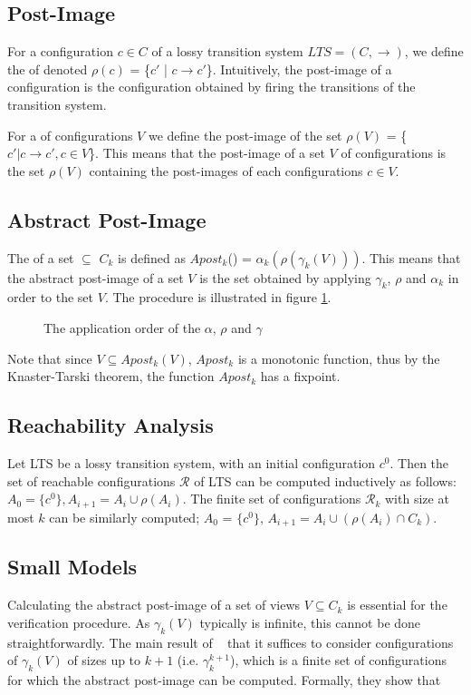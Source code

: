 \subsection{Post-Image}
For a configuration $c\in C$ of a lossy transition system $LTS = (C,\rightarrow)$, we define the  of  denoted $\rho(c)$ = \{$c'$ | $c \rightarrow c'$\}. Intuitively, the post-image of a configuration is the configuration obtained by firing the transitions of the transition system.

For a  of configurations $V$ we define the post-image of the set $\rho(V)$ = \{$c' | c \rightarrow c', c \in V$\}. This means that the post-image of a set $V$ of configurations is the set $\rho(V)$ containing the post-images of each configurations $c\in V$.

\subsection{Abstract Post-Image}
The  of a set  $\subseteq$ $C_k$ is defined as $Apost_k$() = $\alpha_k(\rho(\gamma_k(V)))$. This means that the abstract post-image of a set $V$ is the set obtained by applying $\gamma_k$, $\rho$ and $\alpha_k$ in order to the set $V$. The procedure is illustrated in figure \ref{apost}.
\begin{figure}
\abstraction
\caption{The application order of the $\alpha$, $\rho$ and $\gamma$}
\label{apost}
\end{figure}

Note that since $V \subseteq Apost_k(V)$, $Apost_k$ is a monotonic function, thus by the Knaster-Tarski theorem, the function $Apost_k$ has a fixpoint.

\subsection{Reachability Analysis}
\label{reachcompute}
Let LTS be a lossy transition system, with an initial configuration $c^0$. Then the set of reachable configurations $\mathcal{R}$ of LTS can be computed inductively as follows: $A_0 = \{c^0\}, A_{i+1}= A_i \cup \rho(A_i)$. The finite set of configurations $\mathcal{R}_k$ with size at most $k$ can be similarly computed; $A_0$ = $\{c^0\}$, $A_{i+1} = A_i \cup (\rho(A_i) \cap C_k)$.

\subsection{Small Models}
\label{proof}
Calculating the abstract post-image of a set of views $V \subseteq C_k$ is essential for the verification procedure. As $\gamma_k(V)$ typically is infinite, this cannot be done straightforwardly. The main result of ~\cite{parosh} that it suffices to consider configurations of $\gamma_k(V)$ of sizes up to $k+1$ (i.e. $\gamma_k^{k+1}$), which is a finite set of configurations for which the abstract post-image can be computed. Formally, they show that

